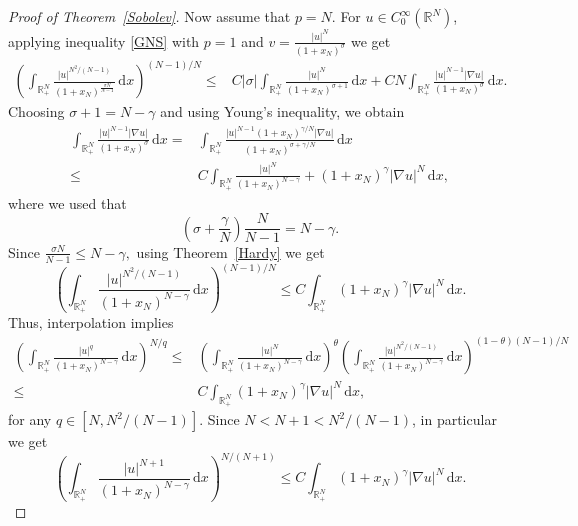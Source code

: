 \documentclass[12pt,reqno]{amsart}
\begin{document}
\begin{proof}[Proof of Theorem~\ref{Sobolev}]
 Now assume that $p=N$. For $u \in C^{\infty}_0(\mathds{R}^N)$, applying inequality \eqref{GNS} with $p=1$ and $v=\frac{|u|^N}{(1+x_N)^\sigma}$  we get
	\begin{align*}
\left(\int_{\mathds{R}^N_+}\frac{|u|^{N^2/(N-1)}}{(1+x_N)^{\frac{\sigma N}{N-1}}}\, \mathrm{d} x\right)^{(N-1)/N}\leq &C|\sigma|\int_{\mathds{R}^{N}_+}\frac{|u|^N}{(1+x_N)^{\sigma+1}}\, \mathrm{d} x+CN\int_{\mathds{R}^{N}_+}\frac{|u|^{N-1}|\nabla u|}{(1+x_N)^{\sigma}}\, \mathrm{d} x.
\end{align*}
Choosing $\sigma+1=N-\gamma$ and 
		using Young's inequality, we obtain
		\begin{align*}
			\int_{\mathds{R}^{N}_+}\frac{|u|^{N-1}|\nabla u|}{(1+x_N)^{\sigma}}\, \mathrm{d} x=&\int_{\mathds{R}^{N}_+}\frac{|u|^{N-1}(1+x_N)^{\gamma/N}|\nabla u|}{(1+x_N)^{\sigma+\gamma/N}}\, \mathrm{d} x\\
			\leq& C\int_{\mathds{R}^{N}_+}\frac{|u|^N}{(1+x_N)^{N-\gamma}}+(1+x_N)^{\gamma}|\nabla u|^N\, \mathrm{d} x,
		\end{align*}
		where we used that 
		\begin{equation}\label{sigma equation}
			\left(\sigma+\frac{\gamma}{N}\right)\frac{N}{N-1}= N-\gamma.
		\end{equation}
Since $
		\frac{\sigma N}{N-1}\leq N-\gamma,
		$
	using Theorem~\ref{Hardy} we get
		\begin{equation}\label{key 1}
  \left(\int_{\mathds{R}^N_+}\frac{|u|^{N^2/(N-1)}}{(1+x_N)^{N-\gamma}}\, \mathrm{d} x\right)^{(N-1)/N}\leq C \int_{\mathds{R}^{N}_+}(1+x_N)^\gamma|\nabla u|^N\, \mathrm{d} x.
		\end{equation}
		Thus, interpolation implies
		\begin{align*}\left(\int_{\mathds{R}^N_+}\frac{|u|^q}{(1+x_N)^{N-\gamma}}\, \mathrm{d} x\right)
			^{N/q}\leq& \left(\int_{\mathds{R}^{N}_+}
			\frac{|u|^N}{(1+x_N)^{N-\gamma}}\, \mathrm{d} x\right)^{\theta}\left(\int_{\mathds{R}^{N}_+}\frac{|u|^{N^2/(N-1)}}{(1+x_N)^{N-\gamma}}\, \mathrm{d} x\right)^{(1-\theta)(N-1)/{N}}\\
			\leq& C\int_{\mathds{R}^{N}_+}(1+x_N)^\gamma|\nabla u|^N\, \mathrm{d} x,
		\end{align*}
		for any $q \in [N,N^2/(N-1)]$. 	Since $N<N+1<N^2/(N-1)$, in particular we get
		\begin{equation}\label{q=N+1 2}
			\left(\int_{\mathds{R}^{N}_+}\frac{|u|^{N+1}}{(1+x_N)^{N-\gamma}}\, \mathrm{d} x\right)^{N/(N+1)}\leq C\int_{\mathds{R}^{N}_+}(1+x_N)^{\gamma}|\nabla u|^N\, \mathrm{d} x.
		\end{equation}

\end{proof}
\end{document}
